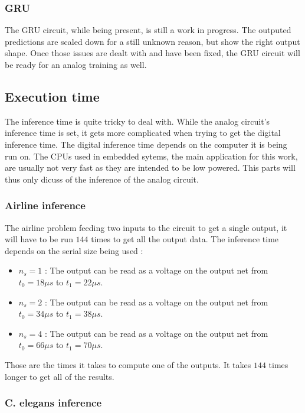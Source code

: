 \subsubsection{\ac{GRU}}

The \ac{GRU} circuit, while being present, is still a work in progress. The outputed predictions are scaled down for a still unknown reason, but show the right output shape. Once those issues are dealt with and have been fixed, the \ac{GRU} circuit will be ready for an analog training as well.

\subsection{Execution time}

The inference time is quite tricky to deal with. While the analog circuit's inference time is set, it gets more complicated when trying to get the digital inference time. The digital inference time depends on the computer it is being run on. The \acp{CPU} used in embedded sytems, the main application for this work, are usually not very fast as they are intended to be low powered. This parts will thus only dicuss of the inference of the analog circuit.

\subsubsection{Airline inference}

The airline problem feeding two inputs to the circuit to get a single output, it will have to be run $144$ times to get all the output data.
The inference time depends on the serial size being used :

\begin{itemize}
  \item $n_s=1$ : The output can be read as a voltage on the output net from $t_0=18\mu s$ to $t_1=22\mu s$.
  \item $n_s=2$ : The output can be read as a voltage on the output net from $t_0=34\mu s$ to $t_1=38\mu s$.
  \item $n_s=4$ : The output can be read as a voltage on the output net from $t_0=66\mu s$ to $t_1=70\mu s$.
\end{itemize}

Those are the times it takes to compute one of the outputs. It takes $144$ times longer to get all of the results.

\subsubsection{\ac{C. elegans} inference}

